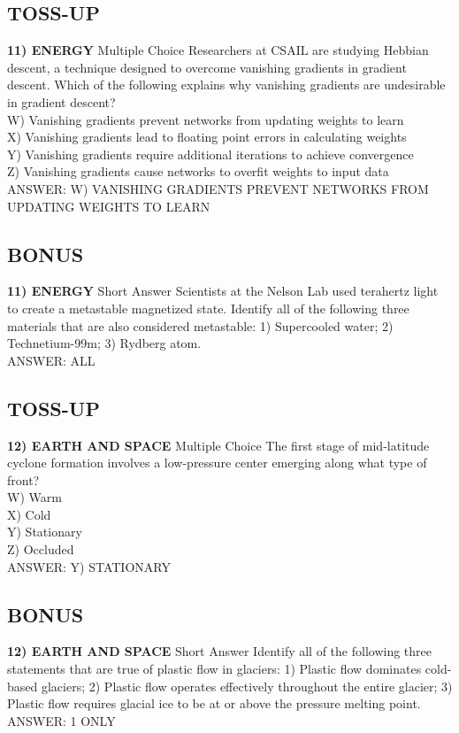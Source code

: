 \documentclass{article}
\begin{document}
\subsection*{TOSS-UP}
\textbf{11) ENERGY} Multiple Choice Researchers at CSAIL are studying Hebbian descent, a technique designed to overcome vanishing gradients in gradient descent. Which of the following explains why vanishing gradients are undesirable in gradient descent?
\\W) Vanishing gradients prevent networks from updating weights to learn
\\X) Vanishing gradients lead to floating point errors in calculating weights
\\Y) Vanishing gradients require additional iterations to achieve convergence
\\Z) Vanishing gradients cause networks to overfit weights to input data
\\ANSWER: W) VANISHING GRADIENTS PREVENT NETWORKS FROM UPDATING WEIGHTS TO LEARN

\subsection*{BONUS}
\textbf{11) ENERGY} Short Answer Scientists at the Nelson Lab used terahertz light to create a metastable magnetized state. Identify all of the following three materials that are also considered metastable: 1) Supercooled water; 2) Technetium-99m; 3) Rydberg atom.
\\ANSWER: ALL

\subsection*{TOSS-UP}
\textbf{12) EARTH AND SPACE} Multiple Choice The first stage of mid-latitude cyclone formation involves a low-pressure center emerging along what type of front?
\\W) Warm
\\X) Cold
\\Y) Stationary
\\Z) Occluded
\\ANSWER: Y) STATIONARY

\subsection*{BONUS}
\textbf{12) EARTH AND SPACE} Short Answer Identify all of the following three statements that are true of plastic flow in glaciers: 1) Plastic flow dominates cold-based glaciers; 2) Plastic flow operates effectively throughout the entire glacier; 3) Plastic flow requires glacial ice to be at or above the pressure melting point.
\\ANSWER: 1 ONLY
\end{document}
